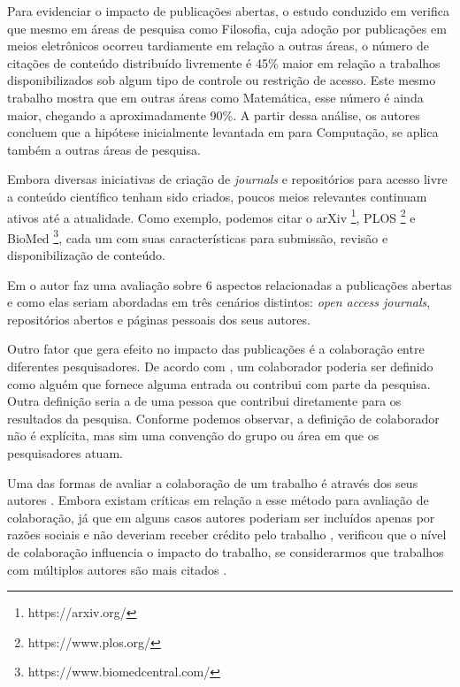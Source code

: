 Para evidenciar o impacto de publicações abertas, o estudo conduzido em \cite{OpenAccessImpact2004} verifica que mesmo em áreas de pesquisa como Filosofia, cuja adoção por publicações em meios eletrônicos ocorreu tardiamente em relação a outras áreas, o número de citações de conteúdo distribuído livremente é 45\% maior em relação a trabalhos disponibilizados sob algum tipo de controle ou restrição de acesso. Este mesmo trabalho mostra que em outras áreas como Matemática, esse número é ainda maior, chegando a aproximadamente 90\%. A partir dessa análise, os autores concluem que a hipótese inicialmente levantada em \cite{Online2001} para Computação, se aplica também a outras áreas de pesquisa.

Embora diversas iniciativas de criação de \textit{journals} e repositórios para acesso livre a conteúdo científico tenham sido criados, poucos meios relevantes continuam ativos até a atualidade. Como exemplo, podemos citar o arXiv \footnote{https://arxiv.org/}, PLOS \footnote{https://www.plos.org/} e BioMed \footnote{https://www.biomedcentral.com/}, cada um com suas características para submissão, revisão e disponibilização de conteúdo.

Em \cite{OpenAccessAnalysis2004} o autor faz uma avaliação sobre 6 aspectos relacionadas a publicações abertas e como elas seriam abordadas em três cenários distintos: \textit{open access journals}, repositórios abertos e páginas pessoais dos seus autores.

Outro fator que gera efeito no impacto das publicações é a colaboração entre diferentes pesquisadores. De acordo com \cite{ResearchCollaboration1997}, um colaborador poderia ser definido como alguém que fornece alguma entrada ou contribui com parte da pesquisa. Outra definição seria a de uma pessoa que contribui diretamente para os resultados da pesquisa. Conforme podemos observar, a definição de colaborador não é explícita, mas sim uma convenção do grupo ou área em que os pesquisadores atuam.

Uma das formas de avaliar a colaboração de um trabalho é através dos seus autores \cite{Bibliographical1971}. Embora existam críticas em relação a esse método para avaliação de colaboração, já que em alguns casos autores poderiam ser incluídos apenas por razões sociais e não deveriam receber crédito pelo trabalho \cite{Stealing1993}, verificou que o nível de colaboração influencia o impacto do trabalho, se considerarmos que trabalhos com múltiplos autores são mais citados \cite{Bibliometrics1986}.

